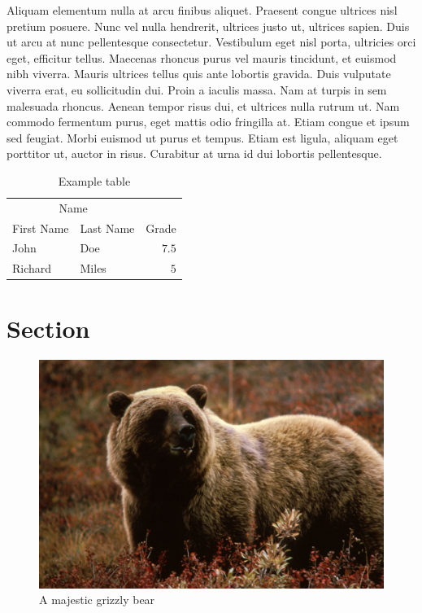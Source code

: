 \documentclass[10pt, a4paper, twocolumn]{article}
\begin{document}
Aliquam elementum nulla at arcu finibus aliquet. Praesent congue ultrices nisl pretium posuere. Nunc vel nulla hendrerit, ultrices justo ut, ultrices sapien. Duis ut arcu at nunc pellentesque consectetur. Vestibulum eget nisl porta, ultricies orci eget, efficitur tellus. Maecenas rhoncus purus vel mauris tincidunt, et euismod nibh viverra. Mauris ultrices tellus quis ante lobortis gravida. Duis vulputate viverra erat, eu sollicitudin dui. Proin a iaculis massa. Nam at turpis in sem malesuada rhoncus. Aenean tempor risus dui, et ultrices nulla rutrum ut. Nam commodo fermentum purus, eget mattis odio fringilla at. Etiam congue et ipsum sed feugiat. Morbi euismod ut purus et tempus. Etiam est ligula, aliquam eget porttitor ut, auctor in risus. Curabitur at urna id dui lobortis pellentesque.

\begin{table}
	\caption{Example table}
	\centering
	\begin{tabular}{llr}
		\toprule
		\multicolumn{2}{c}{Name} \\
		\cmidrule(r){1-2}
		First Name & Last Name & Grade \\
		\midrule
		John & Doe & $7.5$ \\
		Richard & Miles & $5$ \\
		\bottomrule
	\end{tabular}
\end{table}


\section{Section}

\begin{figure}
	\includegraphics[width=\linewidth]{bear.jpg} %
	\caption{A majestic grizzly bear} %
	\label{bear} %
\end{figure}
\end{document}
